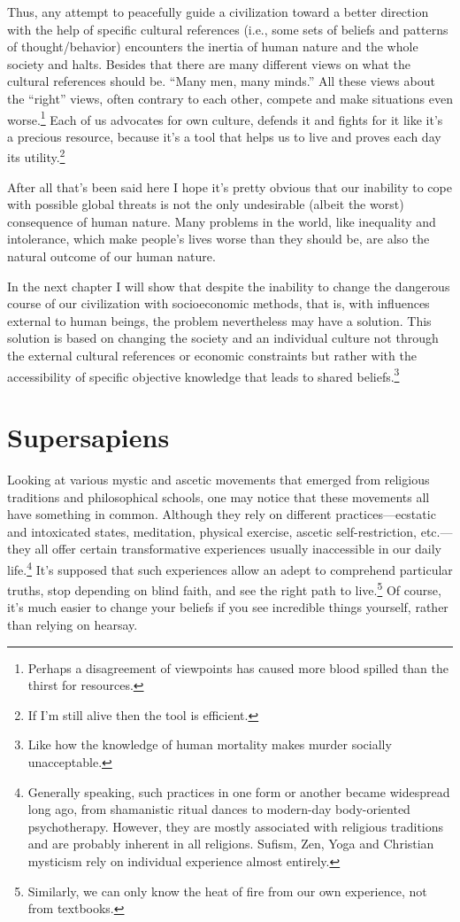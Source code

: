 \documentclass[12pt]{report}
\begin{document}
\noindent Thus, any attempt to peacefully guide a civilization toward a better direction with the help of specific cultural references (i.e., some sets of beliefs and patterns of thought/behavior) encounters the inertia of human nature and the whole society and halts. Besides that there are many different views on what the cultural references should be. ``Many men, many minds.'' All these views about the ``right'' views, often contrary to each other, compete and make situations even worse.\footnote{Perhaps a disagreement of viewpoints has caused more blood spilled than the thirst for resources.} Each of us advocates for own culture, defends it and fights for it like it’s a precious resource, because it’s a tool that helps us to live and proves each day its utility.\footnote{If I’m still alive then the tool is efficient.}

\noindent After all that’s been said here I hope it’s pretty obvious that our inability to cope with possible global threats is not the only undesirable (albeit the worst) consequence of human nature. Many problems in the world, like inequality and intolerance, which make people’s lives worse than they should be, are also the natural outcome of our human nature.

\noindent In the next chapter I will show that despite the inability to change the dangerous course of our civilization with socioeconomic methods, that is, with influences external to human beings, the problem nevertheless may have a solution. This solution is based on changing the society and an individual culture not through the external cultural references or economic constraints but rather with the accessibility of specific objective knowledge that leads to shared beliefs.\footnote{Like how the knowledge of human mortality makes murder socially unacceptable.}

\chapter*{Supersapiens}

Looking at various mystic and ascetic movements that emerged from religious traditions and philosophical schools, one may notice that these movements all have something in common. Although they rely on different practices\thinspace---\thinspace ecstatic and intoxicated states, meditation, physical exercise, ascetic self-restriction, etc.\thinspace---\thinspace they all offer certain transformative experiences usually inaccessible in our daily life.\footnote{Generally speaking, such practices in one form or another became widespread long ago, from shamanistic ritual dances to modern-day body-oriented psychotherapy. However, they are mostly associated with religious traditions and are probably inherent in all religions. Sufism, Zen, Yoga and Christian mysticism rely on individual experience almost entirely.} It’s supposed that such experiences allow an adept to comprehend particular truths, stop depending on blind faith, and see the right path to live.\footnote{Similarly, we can only know the heat of fire from our own experience, not from textbooks.} Of course, it’s much easier to change your beliefs if you see incredible things yourself, rather than relying on hearsay.
\end{document}
